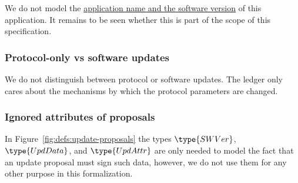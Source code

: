 We do not model the
\href{https://github.com/input-output-hk/cardano-sl/blob/develop/docs/block-processing/us.md#software-version}{application
  name and the software version} of this application. It remains to be seen
whether this is part of the scope of this specification.


\subsubsection{Protocol-only vs software updates}
\label{sec:protocol-vs-software-updates}

We do not distinguish between protocol or software updates. The ledger only
cares about the mechanisms by which the protocol parameters are changed.

\subsubsection{Ignored attributes of proposals}

In Figure~\ref{fig:defs:update-proposals} the types $\type{SWVer}$,
$\type{UpdData}$, and $\type{UpdAttr}$ are only needed to model the fact that
an update proposal must sign such data, however, we do not use them for any
other purpose in this formalization.
